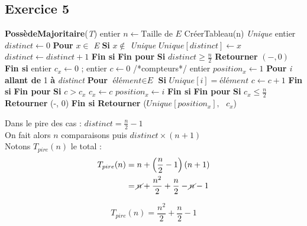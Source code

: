 \documentclass{article}[12pt]
\newcommand*{\Si}{\textbf{Si }}
\newcommand*{\finsi}{\textbf{Fin si }}
\newcommand*{\pour}{\textbf{Pour }}
\newcommand*{\finpour}{\textbf{Fin pour }}
\newcommand*{\allant}{\textbf{ allant de }}
\newcommand*{\jusqua}{\textbf{ à }}
\newcommand*{\res}{\textbf{Retourner }}
\begin{document}
\newpage
\subsection*{Exercice 5}
\begin{algorithm}
\caption{Teste si E possède un élément \textit{majoritaire} et le renvoie le cas échéant}
\begin{algorithmic}[1]
\State\textbf{PossèdeMajoritaire}(\textit{T})
\State \qquad entier $n \gets \text{Taille de } \textit{E}$
\State \qquad CréerTableau(n) \textit{Unique}
\State \qquad entier $distinct \gets 0$
\State
\State \qquad \pour $x\in$ \textit{E}
\State \qquad \qquad \Si $x\notin$ \textit{Unique}
\State \qquad \qquad \qquad $\textit{Unique}[distinct]\gets x$
\State \qquad \qquad \qquad $distinct \gets distinct + 1$
\State \qquad \qquad \finsi
\State \qquad \finpour
\State
\State \qquad \Si $distinct \geq \frac{n}{2}$
\State \qquad \qquad \res $(-, 0)$
\State \qquad \finsi
\State
\State \qquad entier $c_x \gets 0$ ; entier $c \gets 0$  \qquad/*compteurs*/
\State \qquad entier $position_x \gets 1$
\State
\State \qquad \pour \textit{i}\allant1\jusqua \textit{distinct}
\State \qquad \qquad \pour $\textit{élément}\in \textit{E}$
\State \qquad \qquad \qquad \Si $\textit{Unique}[i] = \textit{élément}$
\State \qquad \qquad \qquad \qquad $c\gets c + 1$
\State \qquad \qquad \qquad \finsi
\State \qquad \qquad \finpour
\State \qquad \qquad \Si $c>c_x$
\State \qquad \qquad \qquad $c_x \gets c$
\State \qquad \qquad \qquad $position_x \gets i$
\State \qquad \qquad \finsi
\State \qquad \finpour
\State
\State \qquad \Si $c_x \leq \frac{n}{2}$
\State \qquad \qquad \res (-, 0)
\State \qquad \finsi
\State \qquad \res ($\textit{Unique}[position_x],\text{ }c_x$)
\end{algorithmic}
\end{algorithm}
Dans le pire des cas : $distinct = \frac{n}{2} - 1$\\
On fait alors $n$ comparaisons puis $distinct\times(n+1)$\\
Notons $T_{pire}(n)$ le total :
\begin{align*}
    T_{pire}(n) &= n + \left(\frac{n}{2} - 1\right)(n+1)\\
    &= \cancel{n} + \frac{n^2}{2} + \frac{n}{2} - \cancel{n} - 1
\end{align*}
\begin{center}
    \begin{tcolorbox}[text width = 5.7cm]
        \[T_{pire}(n) = \frac{n^2}{2} + \frac{n}{2} - 1\]
    \end{tcolorbox}
\end{center}
\end{document}
